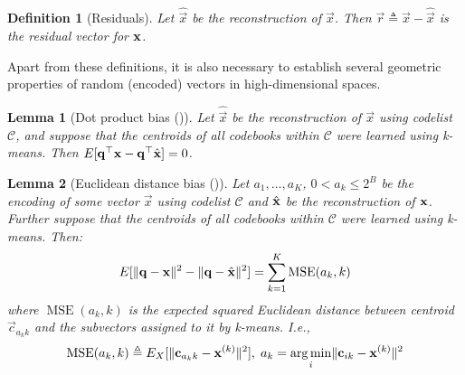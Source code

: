 \documentclass[]{article}
\newtheorem{lemma}{Lemma}[section]
\newtheorem{definition}{Definition}[section]
\DeclareMathOperator{\MSE}{MSE}
\begin{document}
\begin{definition}[Residuals]
Let $\hat{\vec{x}}$ be the reconstruction of $\vec{x}$. Then $\vec{r} \triangleq \vec{x} - \hat{\vec{x}}$ is the residual vector for $\mathbf{x}$.
\end{definition}

Apart from these definitions, it is also necessary to establish several geometric properties of random (encoded) vectors in high-dimensional spaces.



\begin{lemma}[Dot product bias (\cite{pairQ})]
Let $\hat{\vec{x}}$ be the reconstruction of $\vec{x}$ using codelist $\mathcal{C}$, and suppose that the centroids of all codebooks within $\mathcal{C}$ were learned using k-means. Then $E[\mathbf{q}^\top \mathbf{x} - \mathbf{q}^\top \hat{\mathbf{x}}] = 0$.
\end{lemma}

\begin{lemma}[Euclidean distance bias (\cite{pq, pairQ})] \label{thm:l2_bias}
Let $a_1,\ldots,a_K$, $0 < a_k \le 2^B$ be the encoding of some vector $\vec{x}$ using codelist $\mathcal{C}$ and $\hat{\mathbf{x}}$ be the reconstruction of $\mathbf{x}$. Further suppose that the centroids of all codebooks within $\mathcal{C}$ were learned using k-means. Then:
\begin{align}
    E[\norm{\q - \x}^2 - \norm{\q - \xhat}^2] = \sum_{k=1}^K \MSE(a_k, k)
\end{align}
where $\MSE(a_k, k)$ is the expected squared Euclidean distance between centroid $\vec{c}_{a{_k}k}$ and the subvectors assigned to it by k-means. I.e.,
\begin{align}
    \MSE(a_k, k) \triangleq E_X[\norm{\vec{c}_{a{_k}k} - \x^{(k)} }^2], \hspace{1mm} a_k = \argmin_i \norm{\vec{c}_{ik} - \x^{(k)} }^2
\end{align}
\end{lemma}
\end{document}
